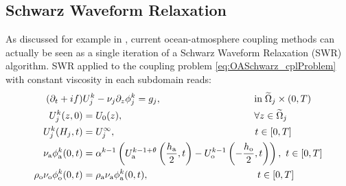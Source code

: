 \subsection{Schwarz Waveform Relaxation}
As discussed for example in \cite{marti_schwarz_2021},
current ocean-atmosphere coupling methods can actually be seen as a 
single iteration of a Schwarz Waveform Relaxation (SWR) algorithm. 
SWR applied to the coupling problem \eqref{eq:OASchwarz_cplProblem}
with constant viscosity in each subdomain reads:
%
\begin{subequations}
\label{eq:SWRbulk}
\begin{align}
(\partial_t + if) &U^k_j - \nu_j\partial_z \phi^k_j  = g_j, 
\hspace{3.4cm} \mbox{in}\;\widetilde{\Omega}_j \times (0,T) \label{eq:ref} \\
U^k_j(z,0) &= U_0(z),   \hspace{4.8cm}  \forall z \in \widetilde{\Omega}_j  \\
U^k_j(H_j, t) &= U^\infty_j, \hspace{5.1cm}  t \in [0,T]\\
\nu_{\rm a}\phi_{\rm a}^{k}(0,t) &=  \alpha^{k-1} 
\left( U_{\rm a}^{k-1+\theta}\left(\frac{h_{\rm a}}{2},t\right) - U_{\rm o}^{k-1}\left(-\frac{h_{\rm o}}{2},t\right)\right), 
\hspace{0.12cm} t \in [0,T] \label{eq:bulkInterfaceCondition} \\
\rho_{\rm o} \nu_{\rm o}\phi^k_{\rm o}(0,t) &= \rho_{\rm a}
\nu_{\rm a}\phi^k_{\rm a}(0,t), \hspace{3.98cm} t \in [0,T] \label{eq:fluxInterfaceCondition}
\end{align}
\end{subequations}
